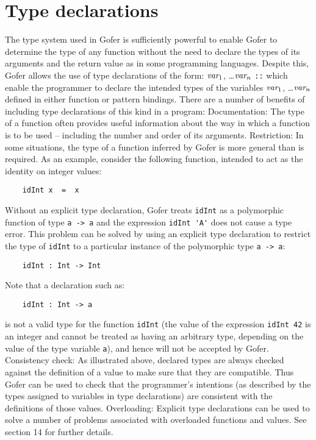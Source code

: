 \section{Type declarations}
The type system used in Gofer is sufficiently powerful to enable  Gofer
to determine the type of any function without the need to  declare  the
types of its arguments and the return  value  as  in  some  programming
languages.  Despite this, Gofer allows the use of type declarations  of
the form:
\BQ
    $\mbox{{\it var}}_1$, \dots $\mbox{{\it var}}_n$ \verb"::" 
\EQ
which enable the programmer  to  declare  the  intended  types  of  the
variables $\mbox{{\it var}}_1$,  \dots  $\mbox{{\it var}}_n$
defined  in  either  function  or  pattern
bindings.   There  are  a  number  of  benefits   of   including   type
declarations of this kind in a program:
\BI
\IT  Documentation: The  type  of  a  function  often  provides  useful
     information about the way in which a function is  to  be  used  --
     including the number and order of its arguments.
\IT  Restriction: In some situations, the type of a  function  inferred
     by Gofer is  more  general  than  is  required.   As  an  example,
     consider the following function, intended to act as  the  identity
     on integer values:
\begin{verbatim}
    idInt x  =  x
\end{verbatim}
     Without an explicit type declaration, Gofer treats  \verb"idInt"  as  a
     polymorphic function of type \verb"a -> a" and the expression \verb"idInt 'A'"
     does not cause a type error.  This problem can  be  solved
     by using an explicit type declaration  to  restrict  the  type  of
     \verb"idInt" to a particular instance of the polymorphic 
     type \verb"a -> a":
\begin{verbatim}
    idInt : Int -> Int
\end{verbatim}
     Note that a declaration such as:
\begin{verbatim}
    idInt : Int -> a
\end{verbatim}
     is not a valid type for the function \verb"idInt"  (the  value  of  the
     expression \verb"idInt 42" is an  integer  and  cannot  be  treated  as
     having an arbitrary type, depending  on  the  value  of  the  type
     variable \verb"a"), and hence will not be accepted by Gofer.
\IT  Consistency check: As illustrated above, declared types are always
     checked against the definition of a value to make sure  that  they
     are compatible.   Thus  Gofer  can  be  used  to  check  that  the
     programmer's intentions (as described  by  the  types  assigned  to
     variables  in  type  declarations)   are   consistent   with   the
     definitions of those values.
\IT  Overloading: Explicit type declarations can be  used  to  solve  a
     number  of  problems  associated  with  overloaded  functions  and
     values.  See section 14 for further details.
\EI

